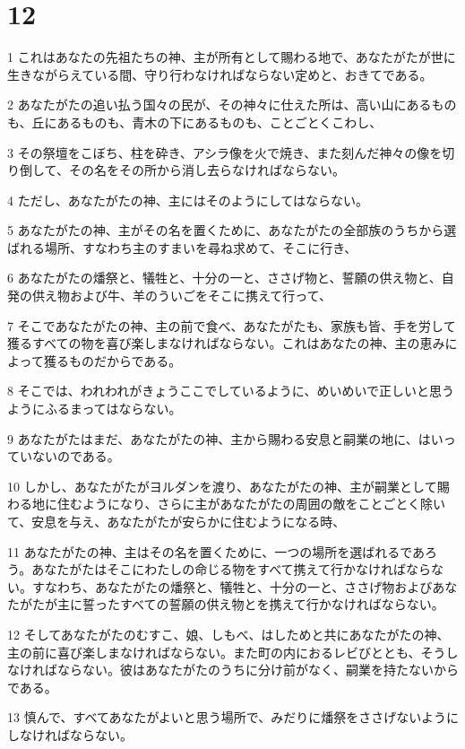 \chapter{12}

\par 1 これはあなたの先祖たちの神、主が所有として賜わる地で、あなたがたが世に生きながらえている間、守り行わなければならない定めと、おきてである。
\par 2 あなたがたの追い払う国々の民が、その神々に仕えた所は、高い山にあるものも、丘にあるものも、青木の下にあるものも、ことごとくこわし、
\par 3 その祭壇をこぼち、柱を砕き、アシラ像を火で焼き、また刻んだ神々の像を切り倒して、その名をその所から消し去らなければならない。
\par 4 ただし、あなたがたの神、主にはそのようにしてはならない。
\par 5 あなたがたの神、主がその名を置くために、あなたがたの全部族のうちから選ばれる場所、すなわち主のすまいを尋ね求めて、そこに行き、
\par 6 あなたがたの燔祭と、犠牲と、十分の一と、ささげ物と、誓願の供え物と、自発の供え物および牛、羊のういごをそこに携えて行って、
\par 7 そこであなたがたの神、主の前で食べ、あなたがたも、家族も皆、手を労して獲るすべての物を喜び楽しまなければならない。これはあなたの神、主の恵みによって獲るものだからである。
\par 8 そこでは、われわれがきょうここでしているように、めいめいで正しいと思うようにふるまってはならない。
\par 9 あなたがたはまだ、あなたがたの神、主から賜わる安息と嗣業の地に、はいっていないのである。
\par 10 しかし、あなたがたがヨルダンを渡り、あなたがたの神、主が嗣業として賜わる地に住むようになり、さらに主があなたがたの周囲の敵をことごとく除いて、安息を与え、あなたがたが安らかに住むようになる時、
\par 11 あなたがたの神、主はその名を置くために、一つの場所を選ばれるであろう。あなたがたはそこにわたしの命じる物をすべて携えて行かなければならない。すなわち、あなたがたの燔祭と、犠牲と、十分の一と、ささげ物およびあなたがたが主に誓ったすべての誓願の供え物とを携えて行かなければならない。
\par 12 そしてあなたがたのむすこ、娘、しもべ、はしためと共にあなたがたの神、主の前に喜び楽しまなければならない。また町の内におるレビびととも、そうしなければならない。彼はあなたがたのうちに分け前がなく、嗣業を持たないからである。
\par 13 慎んで、すべてあなたがよいと思う場所で、みだりに燔祭をささげないようにしなければならない。
